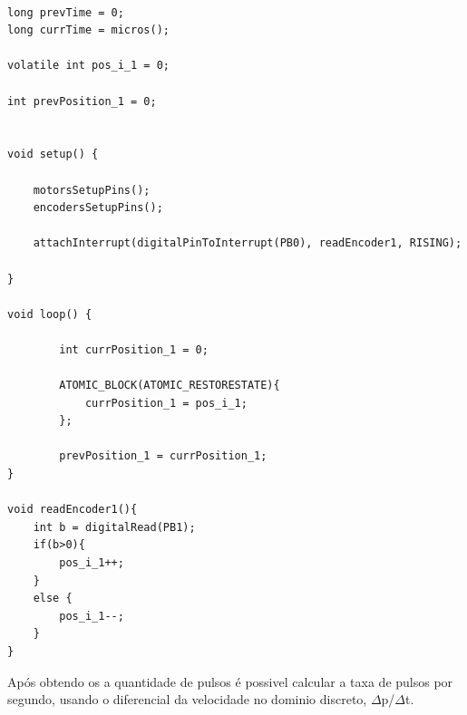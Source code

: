 \lstset{language=C}
\begin{lstlisting}

long prevTime = 0;
long currTime = micros();

volatile int pos_i_1 = 0;

int prevPosition_1 = 0;


void setup() {

    motorsSetupPins();
    encodersSetupPins();

    attachInterrupt(digitalPinToInterrupt(PB0), readEncoder1, RISING);
    
}

void loop() {

		int currPosition_1 = 0;

        ATOMIC_BLOCK(ATOMIC_RESTORESTATE){
            currPosition_1 = pos_i_1;
        };
        
		prevPosition_1 = currPosition_1;
}

void readEncoder1(){ 
    int b = digitalRead(PB1);
    if(b>0){
        pos_i_1++;
    }
    else {
        pos_i_1--;
    }
}

\end{lstlisting}


Após obtendo os a quantidade de pulsos é possivel calcular a taxa de pulsos por segundo, usando o diferencial da velocidade no dominio discreto, $\Delta$p/$\Delta$t.


